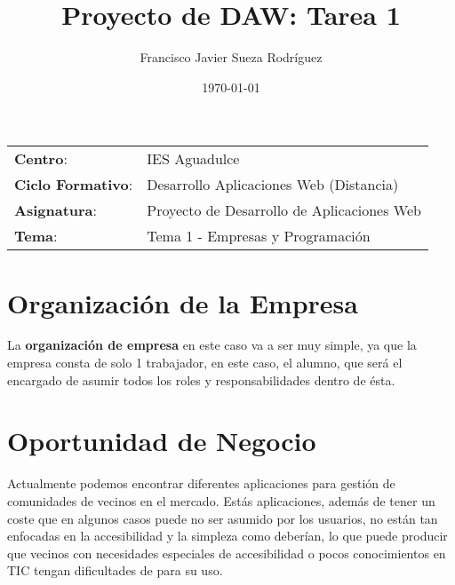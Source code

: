 


\title{
\vspace{10ex}
\normalfont \normalsize
\huge \textbf{Proyecto de DAW: Tarea 1}
}
\author{Francisco Javier Sueza Rodríguez}
\date{\normalsize\today}




\maketitle

\thispagestyle{empty}

\vspace{65ex}

\begin{center}
    \begin{tabular}{l l}
        \textbf{Centro}: & IES Aguadulce \\
        \textbf{Ciclo Formativo}: & Desarrollo Aplicaciones Web (Distancia)\\
        \textbf{Asignatura}: & Proyecto de Desarrollo de Aplicaciones Web\\
        \textbf{Tema}: & Tema 1 - Empresas y Programación\\
    \end{tabular}
\end{center}

\newpage

\tableofcontents

\newpage

\section{Organización de la Empresa}
La \textbf{organización de empresa} en este caso va a ser muy simple, ya que la empresa consta de solo 1 trabajador, en este caso, el alumno, que será el encargado de asumir todos los roles y responsabilidades dentro de ésta.

\section{Oportunidad de Negocio}
Actualmente podemos encontrar diferentes aplicaciones para gestión de comunidades de vecinos en el mercado. Estás aplicaciones, además de tener un coste que en algunos casos puede no ser asumido por los usuarios, no están tan enfocadas en la accesibilidad y la simpleza como deberían, lo que puede producir que vecinos con necesidades especiales de accesibilidad o pocos conocimientos en TIC tengan dificultades de para su uso.

